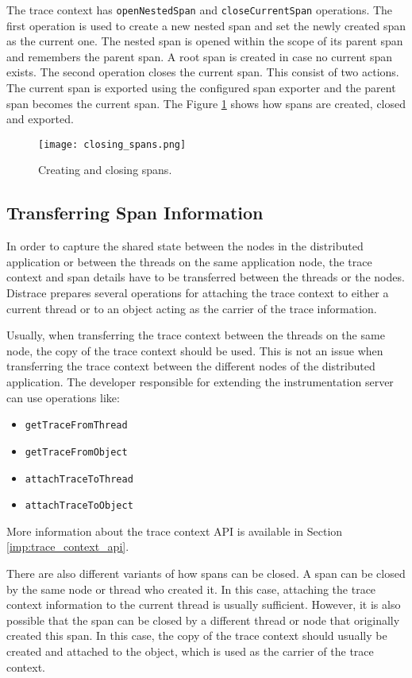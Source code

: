 The trace context has \texttt{openNestedSpan} and \texttt{closeCurrentSpan} operations. The first operation is used to create a new nested span and set the newly created span as the current one. The nested span is opened within the scope of its parent span and remembers the parent span. A root span is created in case no current span exists. The second operation closes the current span. This consist of two actions. The current span is exported using the configured span exporter and the parent span becomes the current span. The Figure \ref{fig:closing_spans} shows how spans are created, closed and exported. \begin{figure}
	\centering
	\texttt{[image: closing\_spans.png]}
	\caption{Creating and closing spans.}
	\label{fig:closing_spans}
\end{figure}

\subsection{Transferring Span Information}
In order to capture the shared state between the nodes in the distributed application or between the threads on the same application node, the trace context and span details have to be transferred between the threads or the nodes. Distrace prepares several operations for attaching the trace context to either a current thread or to an object acting as the carrier of the trace information.

Usually, when transferring the trace context between the threads on the same node, the copy of the trace context should be used. This is not an issue when transferring the trace context between the different nodes of the distributed application. The developer responsible for extending the instrumentation server can use operations like:
\begin{itemize}
	\item  \texttt{getTraceFromThread}
	\item \texttt{getTraceFromObject}
	\item \texttt{attachTraceToThread}
	\item \texttt{attachTraceToObject}
\end{itemize}
More information about the trace context API is available in Section \ref{imp:trace_context_api}.

There are also different variants of how spans can be closed. A span can be closed by the same node or thread who created it. In this case, attaching the trace context information to the current thread is usually sufficient. However, it is also possible that the span can be closed by a different thread or node that originally created this span. In this case, the copy of the trace context should usually be created and attached to the object, which is used as the carrier of the trace context.
